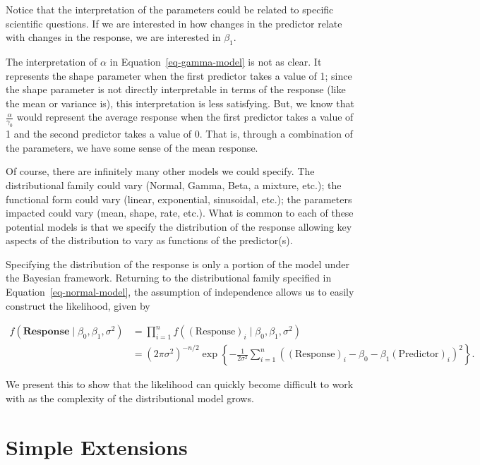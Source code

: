 \documentclass[
  letterpaper,
  DIV=11,
  numbers=noendperiod]{scrreprt}
\theoremstyle{definition}
\theoremstyle{definition}
\theoremstyle{plain}
\theoremstyle{remark}
\begin{document}
Notice that the interpretation of the parameters could be related to
specific scientific questions. If we are interested in how changes in
the predictor relate with changes in the response, we are interested in
\(\beta_1\).

The interpretation of \(\alpha\) in Equation~\ref{eq-gamma-model} is not
as clear. It represents the shape parameter when the first predictor
takes a value of 1; since the shape parameter is not directly
interpretable in terms of the response (like the mean or variance is),
this interpretation is less satisfying. But, we know that
\(\frac{\alpha}{\gamma_0}\) would represent the average response when
the first predictor takes a value of 1 and the second predictor takes a
value of 0. That is, through a combination of the parameters, we have
some sense of the mean response.

Of course, there are infinitely many other models we could specify. The
distributional family could vary (Normal, Gamma, Beta, a mixture, etc.);
the functional form could vary (linear, exponential, sinusoidal, etc.);
the parameters impacted could vary (mean, shape, rate, etc.). What is
common to each of these potential models is that we specify the
distribution of the response allowing key aspects of the distribution to
vary as functions of the predictor(s).

Specifying the distribution of the response is only a portion of the
model under the Bayesian framework. Returning to the distributional
family specified in Equation~\ref{eq-normal-model}, the assumption of
independence allows us to easily construct the likelihood, given by

\[
\begin{aligned}
  f\left(\mathbf{Response} \mid \beta_0, \beta_1, \sigma^2\right) 
    &= \prod_{i=1}^{n} f\left((\text{Response})_i \mid \beta_0, \beta_1, \sigma^2\right) \\
    &= \left(2\pi \sigma^2\right)^{-n/2} \exp\left\{-\frac{1}{2\sigma^2}\sum_{i=1}^{n} \left((\text{Response})_i - \beta_0 - \beta_1 (\text{Predictor})_i\right)^2\right\}.
\end{aligned}
\]

We present this to show that the likelihood can quickly become difficult
to work with as the complexity of the distributional model grows.

\hypertarget{simple-extensions}{%
\section{Simple Extensions}\label{simple-extensions}}
\end{document}
